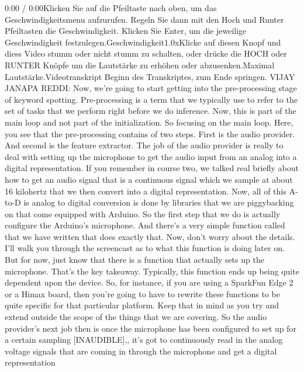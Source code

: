  
     0:00 / 0:00Klicken Sie auf die Pfeiltaste nach oben, um das Geschwindigkeitsmenu aufzurufen. Regeln Sie dann mit den Hoch und Runter Pfeiltasten die Geschwindigkeit. Klicken Sie Enter, um die jeweilige Geschwindigkeit festzulegen.Geschwindigkeit1.0xKlicke auf diesen Knopf und diess Video stumm oder nicht stumm zu schalten, oder drücke die HOCH oder RUNTER Knöpfe um die Lautstärke zu erhöhen oder abzusenken.Maximal Lautstärke.Videotranskript
     Beginn des Transkriptes, zum Ende springen.
     VIJAY JANAPA REDDI: Now, we're going to start
     getting into the pre-processing stage of keyword spotting.
     Pre-processing is a term that we typically
     use to refer to the set of tasks that we perform right before we do inference.
     Now, this is part of the main loop and not part of the initialization.
     So focusing on the main loop.
     Here, you see that the pre-processing contains of two steps.
     First is the audio provider.
     And second is the feature extractor.
     The job of the audio provider is really to deal
     with setting up the microphone to get the audio input from an analog
     into a digital representation.
     If you remember in course two, we talked real briefly
     about how to get an audio signal that is a continuous signal which
     we sample at about 16 kilohertz that we then
     convert into a digital representation.
     Now, all of this A-to-D is analog to digital conversion
     is done by libraries that we are piggybacking
     on that come equipped with Arduino.
     So the first step that we do is actually configure the Arduino's microphone.
     And there's a very simple function called that we have written
     that does exactly that.
     Now, don't worry about the details.
     I'll walk you through the screencast as to what
     this function is doing later on.
     But for now, just know that there is a function that
     actually sets up the microphone.
     That's the key takeaway.
     Typically, this function ends up being quite dependent upon the device.
     So, for instance, if you are using a SparkFun Edge 2 or a Himax board,
     then you're going to have to rewrite these functions to be quite
     specific for that particular platform.
     Keep that in mind as you try and extend outside the scope of the things
     that we are covering.
     So the audio provider's next job then is once the microphone has been configured
     to set up for a certain sampling [INAUDIBLE],,
     it's got to continuously read in the analog voltage signals that
     are coming in through the microphone and get a digital representation
